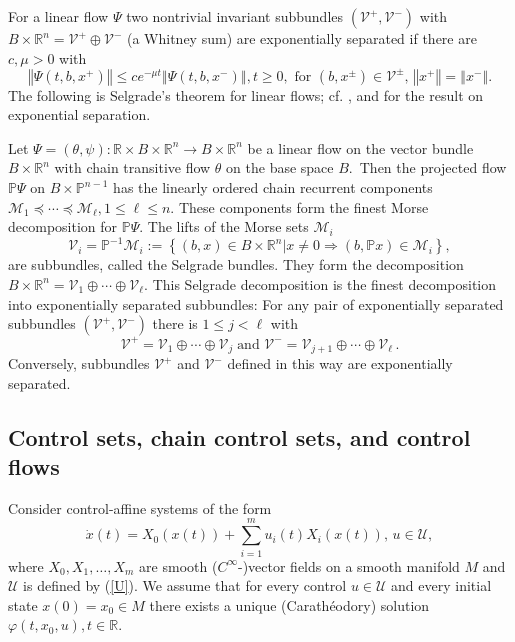 \documentclass{siamltex}%
\begin{document}
For a linear flow $\Psi$ two nontrivial invariant subbundles $(\mathcal{V}%
^{+},\mathcal{V}^{-})$ with $B\times\mathbb{R}^{n}=\mathcal{V}^{+}%
\oplus\mathcal{V}^{-}$ (a Whitney sum) are exponentially separated if there
are $c,\mu>0$ with%
\begin{equation}
\left\Vert \Psi(t,b,x^{+})\right\Vert \leq ce^{-\mu t}\left\Vert
\Psi(t,b,x^{-})\right\Vert ,t\geq0,\text{ for }(b,x^{\pm})\in\mathcal{V}^{\pm
},\,\left\Vert x^{+}\right\Vert =\left\Vert x^{-}\right\Vert . \label{exp_sep}%
\end{equation}
The following is Selgrade's theorem for linear flows; cf. \cite[Theorem
9.2.5]{ColK14}, and \cite[Theorem 5.1.4]{ColK00} for the result on exponential separation.

\begin{theorem}
\label{Theorem_Selgrade}Let $\Psi=(\theta,\psi):\mathbb{R}\times
B\times\mathbb{R}^{n}\rightarrow B\times\mathbb{R}^{n}$ be a linear flow on
the vector bundle $B\times\mathbb{R}^{n}$ with chain transitive flow $\theta$
on the base space $B$.\ Then the projected flow $\mathbb{P}\Psi$ on
$B\times\mathbb{P}^{n-1}$ has the linearly ordered chain recurrent components
$\mathcal{M}_{1}\preceq\cdots\preceq\mathcal{M}_{\ell},1\leq\ell\leq n$. These
components form the finest Morse decomposition for $\mathbb{P}\Psi$. The lifts
of the Morse sets $\mathcal{M}_{i}$
\[
\mathcal{V}_{i}=\mathbb{P}^{-1}\mathcal{M}_{i}:=\left\{  (b,x)\in
B\times\mathbb{R}^{n}\left\vert x\not =0\Rightarrow(b,\mathbb{P}%
x)\in\mathcal{M}_{i}\right.  \right\}  ,
\]
are subbundles, called the Selgrade bundles. They form the decomposition
$B\times\mathbb{R}^{n}=\mathcal{V}_{1}\oplus\cdots\oplus\mathcal{V}_{\ell}$.
This Selgrade decomposition is the finest decomposition into exponentially
separated subbundles: For any pair of exponentially separated subbundles
$(\mathcal{V}^{+},\mathcal{V}^{-})$ there is $1\leq j<\ell$ with
\[
\mathcal{V}^{+}=\mathcal{V}_{1}\oplus\cdots\oplus\mathcal{V}_{j}%
\;\text{and\ }\mathcal{V}^{-}=\mathcal{V}_{j+1}\oplus\cdots\oplus
\mathcal{V}_{\ell}\,.
\]
Conversely, subbundles $\mathcal{V}^{+}$ and $\mathcal{V}^{-}$ defined in this
way are exponentially separated.
\end{theorem}

\subsection{Control sets, chain control sets, and control
flows\label{Subsection2.2}}

Consider control-affine systems of the form
\begin{equation}
\dot{x}(t)=X_{0}(x(t))+\sum_{i=1}^{m}u_{i}(t)X_{i}(x(t)),\,u\in\mathcal{U},
\label{control1}%
\end{equation}
where $X_{0},X_{1},\ldots,X_{m}$ are smooth ($C^{\infty}$-)vector fields on a
smooth manifold $M$ and $\mathcal{U}$ is defined by (\ref{U}). We assume that
for every control $u\in\mathcal{U}$ and every initial state $x(0)=x_{0}\in M$
there exists a unique (Carath\'{e}odory) solution $\varphi(t,x_{0}%
,u),t\in\mathbb{R}$.
\end{document}
